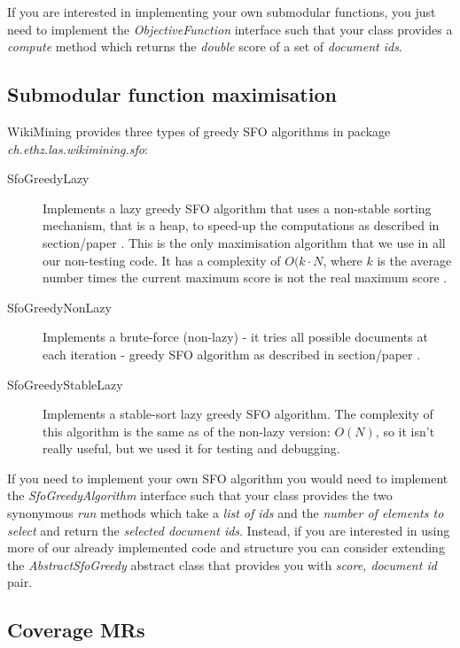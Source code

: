 If you are interested in implementing your own submodular functions, you just
need to implement the \emph{ObjectiveFunction} interface such that your class
provides a \emph{compute} method which returns the \emph{double} score of a set
of \emph{document ids}.

\subsection{Submodular function maximisation}

WikiMining provides three types of greedy \acf{SFO} algorithms in package
\emph{ch.ethz.las.wikimining.sfo}:
\begin{description}
  \item[SfoGreedyLazy] Implements a lazy greedy \ac{SFO} algorithm that uses a
  non-stable sorting mechanism, that is a heap, to speed-up the computations as
  described in section/paper . This is the only maximisation
  algorithm that we use in all our non-testing code. It has a complexity of
  \(O(k \cdot N\), where \(k\) is the average number times the current maximum
  score is not the real maximum score .
  \item[SfoGreedyNonLazy] Implements a brute-force (non-lazy) - it tries all
  possible documents at each iteration - greedy \ac{SFO} algorithm as described
  in section/paper .
  \item[SfoGreedyStableLazy] Implements a stable-sort lazy greedy \ac{SFO}
  algorithm. The complexity of this algorithm is the same as of the non-lazy
  version: \(O(N)\), so it isn't really useful, but we used it for testing and
  debugging.
\end{description}

If you need to implement your own \acl{SFO} algorithm you would need to
implement the \emph{SfoGreedyAlgorithm} interface such that your class provides
the two synonymous \emph{run} methods which take a \emph{list of ids} and the
\emph{number of elements to select} and return the \emph{selected document
ids}. Instead, if you are interested in using more of our already implemented
code and structure you can consider extending the \emph{AbstractSfoGreedy}
abstract class that provides you with \emph{score, document id} pair.

\subsection{Coverage \aclp{MR}}

